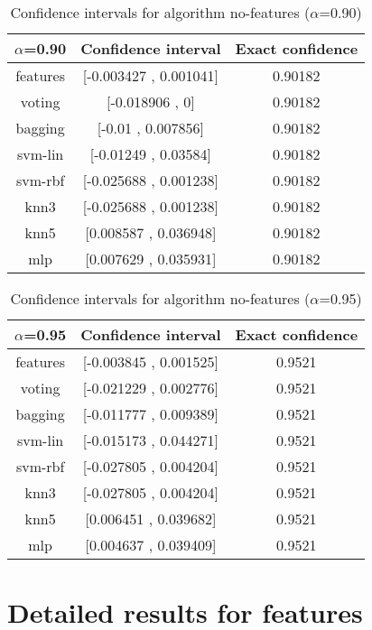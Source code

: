 \documentclass[a4paper,10pt]{article}
\begin{document}
\begin{table}[!htp]
\centering\small
\begin{tabular}{
|c|c|c|}
\hline
 $\alpha$=0.90 & Confidence interval & Exact confidence \\ \hline 
features & [-0.003427 , 0.001041] & 0.90182\\ \hline 
voting & [-0.018906 , 0] & 0.90182\\ \hline 
bagging & [-0.01 , 0.007856] & 0.90182\\ \hline 
svm-lin & [-0.01249 , 0.03584] & 0.90182\\ \hline 
svm-rbf & [-0.025688 , 0.001238] & 0.90182\\ \hline 
knn3 & [-0.025688 , 0.001238] & 0.90182\\ \hline 
knn5 & [0.008587 , 0.036948] & 0.90182\\ \hline 
mlp & [0.007629 , 0.035931] & 0.90182\\ \hline 

\end{tabular}
\caption{Confidence intervals for algorithm no-features ($\alpha$=0.90)}
\end{table}
\begin{table}[!htp]
\centering\small
\begin{tabular}{
|c|c|c|}
\hline
 $\alpha$=0.95 & Confidence interval & Exact confidence \\ \hline 
features & [-0.003845 , 0.001525] & 0.9521\\ \hline 
voting & [-0.021229 , 0.002776] & 0.9521\\ \hline 
bagging & [-0.011777 , 0.009389] & 0.9521\\ \hline 
svm-lin & [-0.015173 , 0.044271] & 0.9521\\ \hline 
svm-rbf & [-0.027805 , 0.004204] & 0.9521\\ \hline 
knn3 & [-0.027805 , 0.004204] & 0.9521\\ \hline 
knn5 & [0.006451 , 0.039682] & 0.9521\\ \hline 
mlp & [0.004637 , 0.039409] & 0.9521\\ \hline 

\end{tabular}
\caption{Confidence intervals for algorithm no-features ($\alpha$=0.95)}
\end{table}

 \clearpage 


\section{Detailed results for features}
\end{document}
